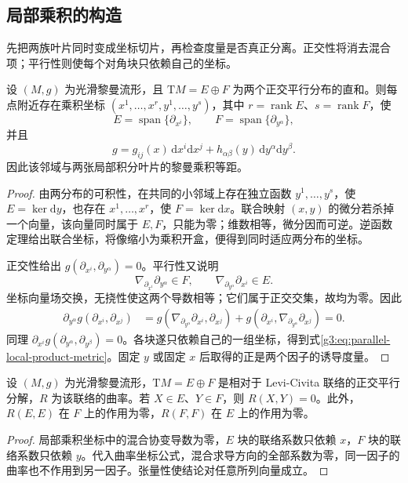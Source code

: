 \subsection{局部乘积的构造}
\label{g3:subsec:0502:04}

先把两族叶片同时变成坐标切片，再检查度量是否真正分离。正交性将消去混合项；平行性则使每个对角块只依赖自己的坐标。

\begin{theorem}\label{g3:thm:parallel-local-product}
	设 \((M,g)\) 为光滑黎曼流形，且
	\(\mathrm{T}M=E\oplus F\) 为两个正交平行分布的直和。则每点附近存在乘积坐标
	\((x^1,\ldots,x^r,y^1,\ldots,y^s)\)，其中 \(r=\operatorname{rank}E\)、\(s=\operatorname{rank}F\)，使
	\[
		E=\operatorname{span}\{\partial_{x^i}\},\qquad
		F=\operatorname{span}\{\partial_{y^\alpha}\},
	\]
	并且
	\begin{equation}\label{g3:eq:parallel-local-product-metric}
		g=g_{ij}(x)\,\mathrm dx^i\mathrm dx^j
			+h_{\alpha\beta}(y)\,\mathrm dy^\alpha\mathrm dy^\beta.
	\end{equation}
	因此该邻域与两张局部积分叶片的黎曼乘积等距。
\end{theorem}
\begin{proof}
	由两分布的可积性，在共同的小邻域上存在独立函数
	\(y^1,\ldots,y^s\)，使 \(E=\ker\mathrm dy\)，也存在
	\(x^1,\ldots,x^r\)，使 \(F=\ker\mathrm dx\)。联合映射
	\((x,y)\) 的微分若杀掉一个向量，该向量同时属于 \(E,F\)，只能为零；维数相等，微分因而可逆。逆函数定理给出联合坐标，将像缩小为乘积开盒，便得到同时适应两分布的坐标。

	正交性给出 \(g(\partial_{x^i},\partial_{y^\alpha})=0\)。平行性又说明
	\[
		\nabla_{\partial_{x^i}}\partial_{y^\alpha}\in F,\qquad
		\nabla_{\partial_{y^\alpha}}\partial_{x^i}\in E.
	\]
	坐标向量场交换，无挠性使这两个导数相等；它们属于正交交集，故均为零。因此
	\[
		\begin{aligned}
			\partial_{y^\alpha}g(\partial_{x^i},\partial_{x^j})
			&=g(\nabla_{\partial_{y^\alpha}}\partial_{x^i},\partial_{x^j})
				+g(\partial_{x^i},\nabla_{\partial_{y^\alpha}}\partial_{x^j})
			=0.
		\end{aligned}
	\]
	同理 \(\partial_{x^i}g(\partial_{y^\alpha},\partial_{y^\beta})=0\)。各块遂只依赖自己的一组坐标，得到式\eqref{g3:eq:parallel-local-product-metric}。固定 \(y\) 或固定 \(x\) 后取得的正是两个因子的诱导度量。
\end{proof}

\begin{corollary}\label{g3:cor:parallel-mixed-curvature}
	设 \((M,g)\) 为光滑黎曼流形，\(\mathrm TM=E\oplus F\) 是相对于 Levi-Civita 联络的正交平行分解，\(R\) 为该联络的曲率。若 \(X\in E\)、\(Y\in F\)，则 \(R(X,Y)=0\)。此外，\(R(E,E)\) 在 \(F\) 上的作用为零，\(R(F,F)\) 在 \(E\) 上的作用为零。
\end{corollary}
\begin{proof}
	局部乘积坐标中的混合协变导数为零，\(E\) 块的联络系数只依赖 \(x\)，\(F\) 块的联络系数只依赖 \(y\)。代入曲率坐标公式，混合求导方向的全部系数为零，同一因子的曲率也不作用到另一因子。张量性使结论对任意所列向量成立。
\end{proof}

